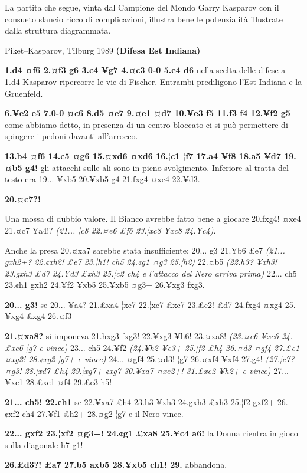 La partita che segue, vinta dal Campione del Mondo Garry Kasparov con il
consueto slancio ricco di complicazioni, illustra bene le potenzialità
illustrate dalla struttura diagrammata.

Piket--Kasparov, Tilburg 1989 \textbf{(Difesa Est Indiana)}

\textbf{1.d4 ¤f6 2.¤f3 g6 3.c4 ¥g7 4.¤c3 0-0 5.e4 d6} nella scelta delle
difese a 1.d4 Kasparov ripercorre le vie di Fischer. Entrambi
prediligono l'Est Indiana e la Gruenfeld.

\textbf{6.¥e2 e5 7.0-0 ¤c6 8.d5 ¤e7 9.¤e1 ¤d7 10.¥e3 f5 11.f3 f4 12.¥f2
g5} come abbiamo detto, in presenza di un centro bloccato ci si può
permettere di spingere i pedoni davanti all'arrocco.

\textbf{13.b4 ¤f6 14.c5 ¤g6 15.¤xd6 ¤xd6 16.¦c1 ¦f7 17.a4 ¥f8 18.a5 ¥d7
19.¤b5 g4!} gli attacchi sulle ali sono in pieno svolgimento. Inferiore
al tratta del testo era 19... ¥xb5 20.¥xb5 g4 21.fxg4 ¤xe4 22.¥d3.

\textbf{20.¤c7?!}


Una mossa di dubbio valore. Il Bianco avrebbe fatto bene a giocare
20.fxg4! ¤xe4 21.¤c7 ¥a4!? \emph{(21... ¦c8 22.¤e6 £f6 23.¦xc8 ¥xc8
24.¥c4)}.

Anche la presa 20.¤xa7 sarebbe stata insufficiente: 20... g3 21.¥b6 £e7
\emph{(21... gxh2+? 22.¢xh2! £e7 23.¦h1! ch5 24.¢g1 ¤g3 25.¦h2)} 22.¤b5
\emph{(22.h3? ¥xh3! 23.gxh3 £d7 24.¥d3 £xh3 25.¦c2 ch4 e l'attacco del
Nero arriva prima)} 22... ch5 23.¢h1 gxh2 24.¥f2 ¥xb5 25.¥xb5 ¤g3+
26.¥xg3 fxg3.

\textbf{20... g3!} se 20... ¥a4? 21.£xa4 ¦xc7 22.¦xc7 £xc7 23.£c2! £d7
24.fxg4 ¤xg4 25.¥xg4 £xg4 26.¤f3

\textbf{21.¤xa8?} si imponeva 21.hxg3 fxg3! 22.¥xg3 ¥h6! 23.¤xa8!
\emph{(23.¤e6 ¥xe6 24.£xe6 ¦g7 e vince)} 23... ch5 24.¥f2 \emph{(24.¥h2
¥e3+ 25.¦f2 £h4 26.¤d3 ¤gf4 27.£e1 ¤xg2! 28.¢xg2 ¦g7+ e vince)} 24...
¤gf4 25.¤d3! ¦g7 26.¤xf4 ¥xf4 27.g4! \emph{(27.¦c7? ¤g3! 28.¦xd7 £h4
29.¦xg7+ ¢xg7 30.¥xa7 ¤xe2+! 31.£xe2 ¥h2+ e vince)} 27... ¥xc1 28.£xc1
¤f4 29.£e3 h5!

\textbf{21... ch5! 22.¢h1} se 22.¥xa7 £h4 23.h3 ¥xh3 24.gxh3 £xh3 25.¦f2
gxf2+ 26.¢xf2 ch4 27.¥f1 £h2+ 28.¤g2 ¦g7 e il Nero vince.

\textbf{22... gxf2 23.¦xf2 ¤g3+! 24.¢g1 £xa8 25.¥c4 a6!} la Donna
rientra in gioco sulla diagonale h7-g1!

\textbf{26.£d3?! £a7 27.b5 axb5 28.¥xb5 ch1! 29.} abbandona.

